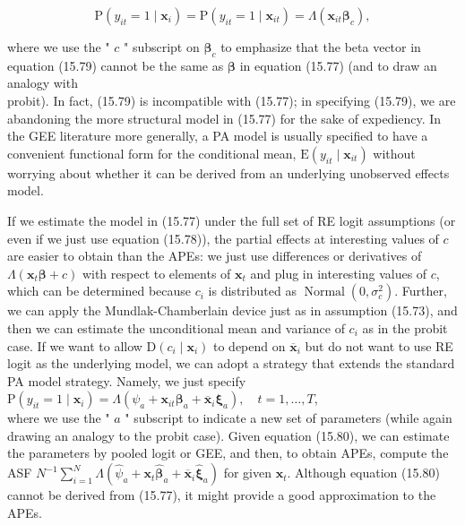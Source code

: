 \documentclass[10pt]{article}
\begin{document}
\begin{equation*}
\mathrm{P}\left(y_{i t}=1 \mid \mathbf{x}_{i}\right)=\mathrm{P}\left(y_{i t}=1 \mid \mathbf{x}_{i t}\right)=\Lambda\left(\mathbf{x}_{i t} \boldsymbol{\beta}_{c}\right), \tag{15.79}
\end{equation*}


where we use the " $c$ " subscript on $\boldsymbol{\beta}_{c}$ to emphasize that the beta vector in equation (15.79) cannot be the same as $\boldsymbol{\beta}$ in equation (15.77) (and to draw an analogy with\\
probit). In fact, (15.79) is incompatible with (15.77); in specifying (15.79), we are abandoning the more structural model in (15.77) for the sake of expediency. In the GEE literature more generally, a PA model is usually specified to have a convenient functional form for the conditional mean, $\mathrm{E}\left(y_{i t} \mid \mathbf{x}_{i t}\right)$ without worrying about whether it can be derived from an underlying unobserved effects model.

If we estimate the model in (15.77) under the full set of RE logit assumptions (or even if we just use equation (15.78)), the partial effects at interesting values of $c$ are easier to obtain than the APEs: we just use differences or derivatives of $\Lambda\left(\mathbf{x}_{t} \boldsymbol{\beta}+c\right)$ with respect to elements of $\mathbf{x}_{t}$ and plug in interesting values of $c$, which can be determined because $c_{i}$ is distributed as $\operatorname{Normal}\left(0, \sigma_{c}^{2}\right)$. Further, we can apply the Mundlak-Chamberlain device just as in assumption (15.73), and then we can estimate the unconditional mean and variance of $c_{i}$ as in the probit case. If we want to allow $\mathrm{D}\left(c_{i} \mid \mathbf{x}_{i}\right)$ to depend on $\overline{\mathbf{x}}_{i}$ but do not want to use RE logit as the underlying model, we can adopt a strategy that extends the standard PA model strategy. Namely, we just specify\\
$\mathrm{P}\left(y_{i t}=1 \mid \mathbf{x}_{i}\right)=\Lambda\left(\psi_{a}+\mathbf{x}_{i t} \boldsymbol{\beta}_{a}+\overline{\mathbf{x}}_{i} \boldsymbol{\xi}_{a}\right), \quad t=1, \ldots, T$,\\
where we use the " $a$ " subscript to indicate a new set of parameters (while again drawing an analogy to the probit case). Given equation (15.80), we can estimate the parameters by pooled logit or GEE, and then, to obtain APEs, compute the ASF $N^{-1} \sum_{i=1}^{N} \Lambda\left(\hat{\psi}_{a}+\mathbf{x}_{t} \hat{\boldsymbol{\beta}}_{a}+\overline{\mathbf{x}}_{i} \hat{\boldsymbol{\xi}}_{a}\right)$ for given $\mathbf{x}_{t}$. Although equation (15.80) cannot be derived from (15.77), it might provide a good approximation to the APEs.
\end{document}
